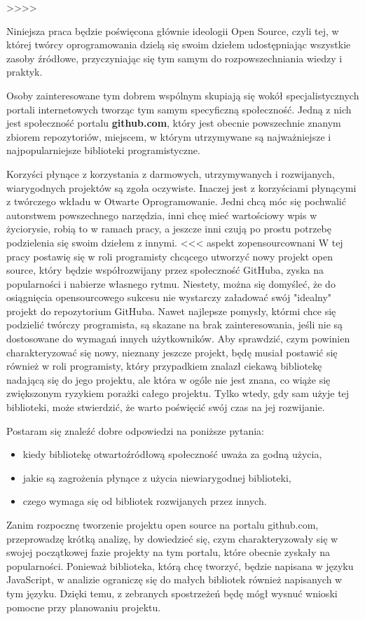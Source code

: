 >>>>

Niniejsza praca będzie poświęcona głównie ideologii Open Source, czyli tej, w której twórcy oprogramowania dzielą się swoim dziełem udostępniając wszystkie zasoby źródłowe, przyczyniając się tym samym do rozpowszechniania wiedzy i praktyk.

Osoby zainteresowane tym dobrem wspólnym skupiają się wokół specjalistycznych portali internetowych tworząc tym samym specyficzną społeczność. Jedną z nich jest społeczność portalu \textbf{github.com}, który jest obecnie powszechnie znanym zbiorem repozytoriów, miejscem, w którym utrzymywane są najważniejsze i najpopularniejsze biblioteki programistyczne.

Korzyści płynące z korzystania z darmowych, utrzymywanych i rozwijanych, wiarygodnych projektów są zgoła oczywiste. Inaczej jest z korzyściami płynącymi z twórczego wkładu w Otwarte Oprogramowanie. Jedni chcą móc się pochwalić autorstwem powszechnego narzędzia, inni chcę mieć wartościowy wpis w życiorysie, robią to w ramach pracy, a jeszcze inni czują po prostu potrzebę podzielenia się swoim dziełem z innymi.
<<< aspekt zopensourcownani
W tej pracy postawię się w roli programisty chcącego utworzyć nowy projekt open source, który będzie współrozwijany przez społeczność GitHuba, zyska na popularności i nabierze własnego rytmu. Niestety, można się domyśleć, że do osiągnięcia opensourcowego sukcesu nie wystarczy załadować swój "idealny" projekt do repozytorium GitHuba. Nawet najlepsze pomysły, którmi chce się podzielić twórczy programista, są skazane na brak zainteresowania, jeśli nie są dostosowane do wymagań innych użytkowników. Aby sprawdzić, czym powinien charakteryzować się nowy, nieznany jeszcze projekt, będę musiał postawić się również w roli programisty, który przypadkiem znalazł ciekawą bibliotekę nadającą się do jego projektu, ale która w ogóle nie jest znana, co wiąże się zwiększonym ryzykiem porażki całego projektu. Tylko wtedy, gdy sam użyje tej biblioteki, może stwierdzić, że warto poświęcić swój czas na jej rozwijanie.

Postaram się znaleźć dobre odpowiedzi na poniższe pytania:
\begin{itemize}
\item kiedy bibliotekę otwartoźródłową społeczność uważa za godną użycia,
\item jakie są zagrożenia płynące z użycia niewiarygodnej biblioteki,
\item czego wymaga się od bibliotek rozwijanych przez innych.
\end{itemize}
Zanim rozpocznę tworzenie projektu open source na portalu github.com, przeprowadzę krótką analizę, by dowiedzieć się, czym charakteryzowały się w swojej początkowej fazie projekty na tym portalu, które obecnie zyskały na popularności. Ponieważ biblioteka, którą chcę tworzyć, będzie napisana w języku JavaScript, w analizie ograniczę się do małych bibliotek również napisanych w tym języku. Dzięki temu, z zebranych spostrzeżeń będę mógł wysnuć wnioski pomocne przy planowaniu projektu.

